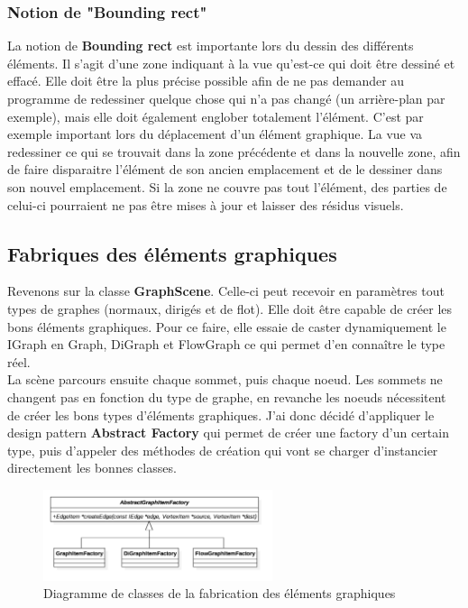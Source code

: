 \documentclass[french]{article}
\begin{document}
			\subsubsection{Notion de "Bounding rect"}
				La notion de \textbf{Bounding rect} est importante lors du dessin des différents éléments. Il s'agit d'une zone indiquant à la vue qu'est-ce qui doit être dessiné et effacé. Elle doit être la plus précise possible afin de ne pas demander au programme de redessiner quelque chose qui n'a pas changé (un arrière-plan par exemple), mais elle doit également englober totalement l'élément. C'est par exemple important lors du déplacement d'un élément graphique. La vue va redessiner ce qui se trouvait dans la zone précédente et dans la nouvelle zone, afin de faire disparaitre l'élément de son ancien emplacement et de le dessiner dans son nouvel emplacement. Si la zone ne couvre pas tout l'élément, des parties de celui-ci pourraient ne pas être mises à jour et laisser des résidus visuels.
			
		\subsection{Fabriques des éléments graphiques}
			Revenons sur la classe \textbf{GraphScene}. Celle-ci peut recevoir en paramètres tout types de graphes (normaux, dirigés et de flot). Elle doit être capable de créer les bons éléments graphiques. Pour ce faire, elle essaie de caster dynamiquement le IGraph en Graph, DiGraph et FlowGraph ce qui permet d'en connaître le type réel. \\
			
			La scène parcours ensuite chaque sommet, puis chaque noeud. Les sommets ne changent pas en fonction du type de graphe, en revanche les noeuds nécessitent de créer les bons types d'éléments graphiques. J'ai donc décidé d'appliquer le design pattern \textbf{Abstract Factory} qui permet de créer une factory d'un certain type, puis d'appeler des méthodes de création qui vont se charger d'instancier directement les bonnes classes.
			
			\begin{figure}[H]
				\centering
				\includegraphics[width=0.6\textwidth]{Conception/visualization/graphitemsfactories.png}
				\caption{Diagramme de classes de la fabrication des éléments graphiques}
			\end{figure}
			
\end{document}
